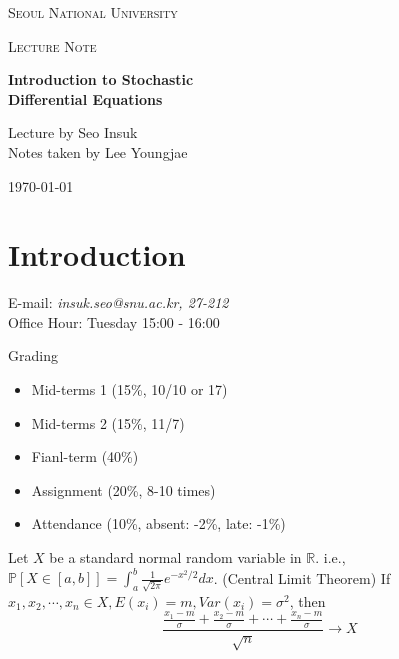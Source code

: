 \documentclass[12pt]{report}
\newcommand{\R}{\mathbb{R}}
\renewcommand{\1}{\mathbb{1}}
\theoremstyle{break}
\theoremstyle{newdef}
\theoremstyle{remark}
\begin{document}
\begin{titlepage}
\centering
{\scshape\LARGE Seoul National University \par}
\vspace{1cm}
{\scshape\Large Lecture Note\par}
\vspace{5.5cm}
{\huge\bfseries Introduction to Stochastic \\Differential Equations\par}
\vspace{1.5cm}
\large Lecture by Seo Insuk \\
Notes taken by Lee Youngjae


\vfill
\vspace{1cm}\par
{\large \today\par}
\end{titlepage}

\setlength{\parindent}{0cm}

\tableofcontents


\setcounter{chapter}{-1}

\chapter{Introduction}
E-mail: \textit{insuk.seo@snu.ac.kr, 27-212}\\
Office Hour: Tuesday 15:00 - 16:00

Grading
\begin{itemize}
\item Mid-terms 1 (15\%, 10/10 or 17)
\item Mid-terms 2 (15\%, 11/7)
\item Fianl-term (40\%)
\item Assignment (20\%, 8-10 times)
\item Attendance (10\%, absent: -2\%, late: -1\%)
\end{itemize}


Let $X$ be a standard normal random variable in $\R$.
i.e., $\mathbb{P}[X \in [a,b]] = \int_a^b \frac{1}{\sqrt{2\pi}} e^{-x^2/2}dx$.
(Central Limit Theorem) If $x_1, x_2, \cdots, x_n \in X, E(x_i) = m, Var(x_i) = \sigma^2$, then
$$
\frac{\frac{x_1-m}{\sigma}+\frac{x_2-m}{\sigma}+\cdots+\frac{x_n-m}{\sigma}}{\sqrt n} \rightarrow X
$$
\end{document}
